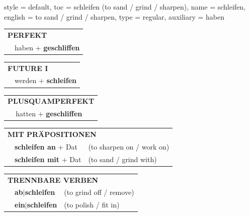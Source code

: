 \begin{verbentry}{
  style = {default},
  toc = {schleifen (to sand / grind / sharpen)},
  name = {schleifen},
  english = {to sand / grind / sharpen},
  type = {regular},
  auxiliary = {haben}
}
 \begin{tabular}{rl}
     \multicolumn{2}{l}{\textbf{PERFEKT}}\\
   & haben + \textbf{geschliffen}\\
  \end{tabular}
\hfill
\begin{tabular}{rl}
    \multicolumn{2}{l}{\textbf{FUTURE I}}\\
   & werden + \textbf{schleifen}\\
  \end{tabular}
\hfill
\begin{tabular}{rl}
    \multicolumn{2}{l}{\textbf{PLUSQUAMPERFEKT}}\\
   & hatten + \textbf{geschliffen}\\
  \end{tabular}

 \vspace{10pt}

\begin{tabular}{lll}
      \multicolumn{3}{l}{\textbf{MIT PRÄPOSITIONEN}}\\
& \textbf{schleifen an} + Dat & (to sharpen on / work on)\\
& \textbf{schleifen mit} + Dat & (to sand / grind with)\\
\end{tabular}
  \hfill
\begin{tabular}{lll}
      \multicolumn{3}{l}{\textbf{TRENNBARE VERBEN}}\\
 & \textbf{ab$|$schleifen} & (to grind off / remove)\\
 & \textbf{ein$|$schleifen} & (to polish / fit in)\\
  \end{tabular}


\vspace{-5pt}
\end{verbentry}


